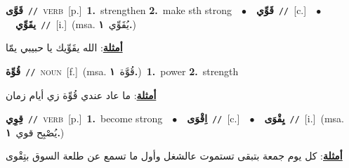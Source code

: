 \documentclass[10pt,a4paper,twoside]{article} %
\begin{document}
\begin{multicols}{2}
{\setlength\topsep{0pt}\textbf{\foreignlanguage{arabic}{قَوَّى}}\ {\color{gray}\texttt{//}\color{black}}\ \textsc{verb}\ [p.]\ \textbf{1.}~strengthen  \textbf{2.}~make sth strong\ \ $\bullet$\ \ \setlength\topsep{0pt}\textbf{\foreignlanguage{arabic}{قَوِّي}}\ {\color{gray}\texttt{//}\color{black}}\ [c.]\ \ $\bullet$\ \ \setlength\topsep{0pt}\textbf{\foreignlanguage{arabic}{يقَوِّي}}\ {\color{gray}\texttt{//}\color{black}}\ [i.]\ \color{gray}(msa. \foreignlanguage{arabic}{يُقَوِّي}~\foreignlanguage{arabic}{\textbf{١.}})\color{black}\  \begin{flushright}\color{gray}\foreignlanguage{arabic}{\textbf{\underline{\foreignlanguage{arabic}{أمثلة}}}: الله يقَوِّيك يا حبيبي يمّا}\end{flushright}\color{black}} \vspace{2mm}

{\setlength\topsep{0pt}\textbf{\foreignlanguage{arabic}{قُوِّة}}\ {\color{gray}\texttt{//}\color{black}}\ \textsc{noun}\ [f.]\ \color{gray}(msa. \foreignlanguage{arabic}{قُوَّة}~\foreignlanguage{arabic}{\textbf{١.}})\color{black}\ \textbf{1.}~power  \textbf{2.}~strength\  \begin{flushright}\color{gray}\foreignlanguage{arabic}{\textbf{\underline{\foreignlanguage{arabic}{أمثلة}}}: ما عاد عندي قُوِّة زي أيام زمان}\end{flushright}\color{black}} \vspace{2mm}

{\setlength\topsep{0pt}\textbf{\foreignlanguage{arabic}{قِوِي}}\ {\color{gray}\texttt{//}\color{black}}\ \textsc{verb}\ [p.]\ \textbf{1.}~become strong\ \ $\bullet$\ \ \setlength\topsep{0pt}\textbf{\foreignlanguage{arabic}{اِقْوَى}}\ {\color{gray}\texttt{//}\color{black}}\ [c.]\ \ $\bullet$\ \ \setlength\topsep{0pt}\textbf{\foreignlanguage{arabic}{يِقْوَى}}\ {\color{gray}\texttt{//}\color{black}}\ [i.]\ \color{gray}(msa. \foreignlanguage{arabic}{يُصْبِح قوي}~\foreignlanguage{arabic}{\textbf{١.}})\color{black}\  \begin{flushright}\color{gray}\foreignlanguage{arabic}{\textbf{\underline{\foreignlanguage{arabic}{أمثلة}}}: كل يوم جمعة بتبقى تستموت عالشغل وأول ما تسمع عن طلعة السوق بتِقْوى}\end{flushright}\color{black}} \vspace{2mm}


\end{multicols}
\end{document}
